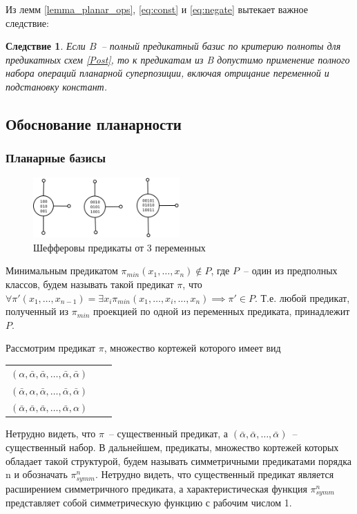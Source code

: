 \documentclass[12pt]{article}
\newtheorem{corollary}[theorem]{Следствие}
\newenvironment{definition}[1][Определение]{\begin{trivlist}
\item[\hskip \labelsep {\bfseries #1}]}{\end{trivlist}}
\begin{document}
Из лемм \ref{lemma_planar_ops}, \ref{eq:const} и \ref{eq:negate} вытекает важное следствие:
\begin{corollary}
\label{can_use_ops}
Если $B$~-- полный предикатный базис по критерию полноты для предикатных схем
\ref{Post}, то к предикатам из B допустимо применение полного набора операций 
планарной суперпозиции, включая отрицание переменной и подстановку констант.
\end{corollary}

\subsection{Обоснование планарности}
\subsubsection{Планарные базисы}

\begin{figure}[htb]
\centering
\includegraphics[width=0.5\textwidth]{scheff3.png}
\caption{Шефферовы предикаты от 3 переменных}
\label{fig:sheff}
\end{figure}

\label{planar_basis}

\begin{definition}
Минимальным предикатом $\pi_{min}(x_1, \dots, x_n) \notin P$, где $P$~-- один из предполных классов, будем называть такой 
предикат $\pi$, что $\forall \pi'(x_1, \dots, x_{n-1}) = \exists x_i \pi_{min}(x_1, \dots, x_{i}, \dots, x_n) \implies \pi' \in P$. 
Т.е. любой предикат,
полученный из $\pi_{min}$ проекцией по одной из переменных предиката, принадлежит $P$.
\end{definition}

\begin{definition}
Рассмотрим предикат 
$\pi$, множество кортежей которого имеет вид
\begin{center}
\begin{tabular}{ccc}
$(\alpha, \bar{\alpha}, \bar{\alpha}, \dots, \bar{\alpha}, \bar{\alpha})$\\
$(\bar{\alpha}, \alpha, \bar{\alpha}, \dots, \bar{\alpha}, \bar{\alpha})$\\
$(\bar{\alpha}, \bar{\alpha}, \bar{\alpha}, \dots, \bar{\alpha}, \alpha)$
\end{tabular}
\end{center}

Нетрудно видеть, что $\pi$~-- существенный предикат, а
$(\bar{\alpha}, \bar{\alpha}, \dots, \bar{\alpha})$~-- существенный набор. 
В дальнейшем, предикаты, множество кортежей которых обладает такой структурой, будем называть 
симметричными предикатами порядка n и обозначать $\pi_{symm}^n$. Нетрудно видеть, что существенный предикат является 
расширением симметричного предиката, а характеристическая функция $\pi_{symm}^n$ представляет собой симметрическую функцию
с рабочим числом 1.
\end{definition}
\end{document}
